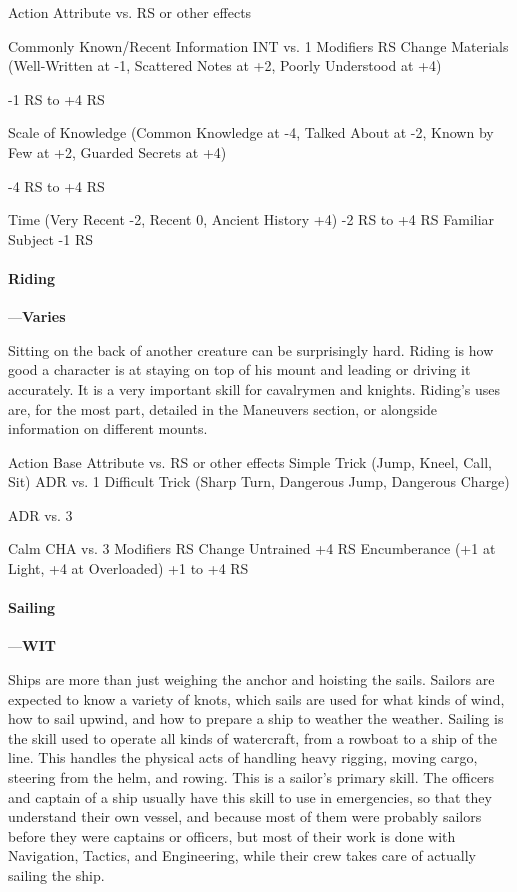 \documentclass[oneside,11pt,english]{book}
\begin{document}
Action Attribute vs. RS or 
other effects 


Commonly Known/Recent Information INT vs. 1 
Modifiers RS Change 
Materials (Well-Written at -1, Scattered Notes at +2, Poorly Understood at 
+4) 

-1 RS to +4 RS 

Scale of Knowledge (Common Knowledge at -4, Talked About at -2, Known 
by Few at +2, Guarded Secrets at +4) 

-4 RS to +4 RS 

Time (Very Recent -2, Recent 0, Ancient History +4) -2 RS to +4 RS 
Familiar Subject -1 RS 

 

 

\paragraph{\label{skill:Riding}Riding}---\quad\textbf{Varies}\par
Sitting on the back of another creature can be surprisingly hard. Riding is how good a character is at staying on top of his mount and leading or driving it accurately. It is a very important skill for cavalrymen and knights. Riding’s uses are, for the most part, detailed in the Maneuvers section, or alongside information on different mounts.


Action Base Attribute vs. RS or other 
effects 
Simple Trick (Jump, Kneel, Call, Sit) ADR vs. 1 
Difficult Trick (Sharp Turn, Dangerous Jump, Dangerous 
Charge) 

ADR vs. 3 

Calm CHA vs. 3 
Modifiers RS Change 
Untrained +4 RS 
Encumberance (+1 at Light, +4 at Overloaded) +1 to +4 RS 


\paragraph{\label{skill:Sailing}Sailing}---\quad\textbf{WIT}\par
Ships are more than just weighing the anchor and hoisting the sails. Sailors are expected to know a variety of knots, which sails are used for what kinds of wind, how to sail upwind, and how to prepare a ship to weather the weather. Sailing is the skill used to operate all kinds of watercraft, from a rowboat to a ship of the line. This handles the physical acts of handling heavy rigging, moving cargo, steering from the helm, and rowing. This is a sailor’s primary skill. The officers and captain of a ship usually have this skill to use in emergencies, so that they understand their own vessel, and because most of them were probably sailors before they were captains or officers, but most of their work is done with Navigation, Tactics, and Engineering, while their crew takes care of actually sailing the ship.
\end{document}

